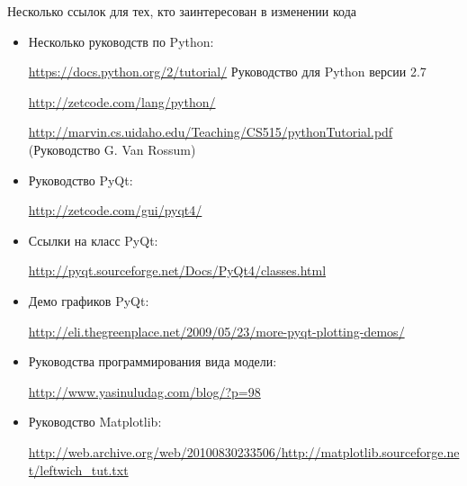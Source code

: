 Несколько ссылок для тех, кто заинтересован в изменении кода
\begin{itemize}
    \item 
    Несколько руководств по Python:

    \url{https://docs.python.org/2/tutorial/} Руководство для Python версии 2.7

    \url{http://zetcode.com/lang/python/}

    \url{http://marvin.cs.uidaho.edu/Teaching/CS515/pythonTutorial.pdf} (Руководство G. Van Rossum)

    \item
    Руководство PyQt:

    \url{http://zetcode.com/gui/pyqt4/}

    \item
    Ссылки на класс PyQt:

    \url{http://pyqt.sourceforge.net/Docs/PyQt4/classes.html}

    \item
    Демо графиков PyQt:

    \url{http://eli.thegreenplace.net/2009/05/23/more-pyqt-plotting-demos/}

    \item
    Руководства программирования вида модели:

    \url{http://www.yasinuludag.com/blog/?p=98}

    \item
    Руководство Matplotlib:

    \url{http://web.archive.org/web/20100830233506/http://matplotlib.sourceforge.net/leftwich_tut.txt}
\end{itemize}